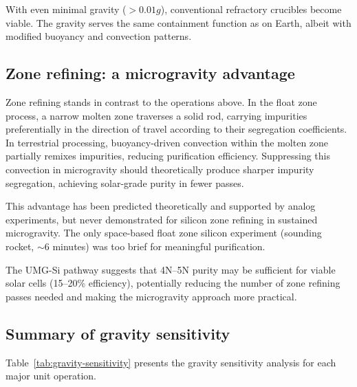 \documentclass[preprint,12pt]{elsarticle}
\begin{document}
With even minimal gravity ($> 0.01g$), conventional refractory crucibles become viable. The gravity serves the same containment function as on Earth, albeit with modified buoyancy and convection patterns.

\subsection{Zone refining: a microgravity advantage}

Zone refining stands in contrast to the operations above. In the float zone process, a narrow molten zone traverses a solid rod, carrying impurities preferentially in the direction of travel according to their segregation coefficients. In terrestrial processing, buoyancy-driven convection within the molten zone partially remixes impurities, reducing purification efficiency. Suppressing this convection in microgravity should theoretically produce sharper impurity segregation, achieving solar-grade purity in fewer passes.

This advantage has been predicted theoretically and supported by analog experiments, but never demonstrated for silicon zone refining in sustained microgravity. The only space-based float zone silicon experiment \cite{dold1997} (sounding rocket, $\sim$6 minutes) was too brief for meaningful purification.

The UMG-Si pathway \cite{fornies2021} suggests that 4N--5N purity may be sufficient for viable solar cells (15--20\% efficiency), potentially reducing the number of zone refining passes needed and making the microgravity approach more practical.

\subsection{Summary of gravity sensitivity}

Table~\ref{tab:gravity-sensitivity} presents the gravity sensitivity analysis for each major unit operation.
\end{document}
